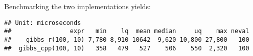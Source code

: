\begin{Shaded}
\begin{Highlighting}[]
 

\NormalTok{);}
  \NormalTok{;}

  \NormalTok{(}
    \NormalTok{(}
\NormalTok{, }\NormalTok{, }\NormalTok{))[}\NormalTok{];}
\NormalTok{, }\NormalTok{), }\NormalTok{)))[}\NormalTok{];}
\NormalTok{    \}}
\NormalTok{  \}}

\NormalTok{\}}
\end{Highlighting}
\end{Shaded}

Benchmarking the two implementations yields:

\begin{Shaded}
\begin{Highlighting}[]
\NormalTok{(}
  \NormalTok{(}\NormalTok{, }\NormalTok{),}
  \NormalTok{(}\NormalTok{, }\NormalTok{)}
\NormalTok{)}
\end{Highlighting}
\end{Shaded}

\begin{verbatim}
## Unit: microseconds
##                expr   min    lq  mean median     uq    max neval
##    gibbs_r(100, 10) 7,780 8,910 10642  9,620 10,800 27,800   100
##  gibbs_cpp(100, 10)   358   479   527    506    550  2,320   100
\end{verbatim}

